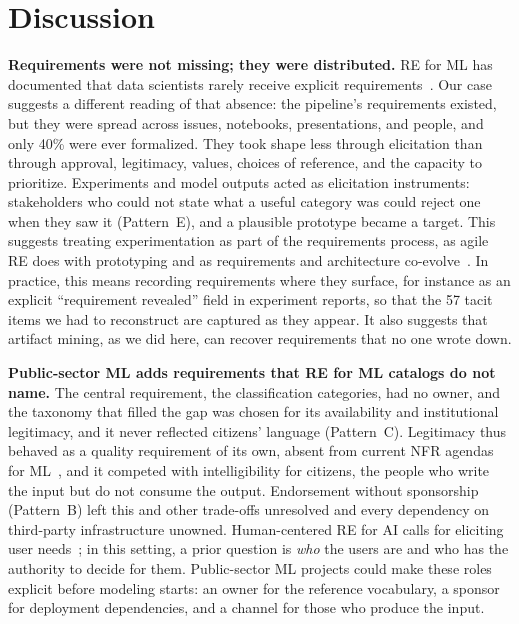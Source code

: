 \documentclass[sigconf,nonacm]{acmart}
\begin{document}
\section{Discussion}
\label{sec:discussion}

\textbf{Requirements were not missing; they were distributed.} RE for ML has documented that data scientists rarely receive explicit requirements~\cite{vogelsang2019}. Our case suggests a different reading of that absence: the pipeline's requirements existed, but they were spread across issues, notebooks, presentations, and people, and only 40\% were ever formalized. They took shape less through elicitation than through approval, legitimacy, values, choices of reference, and the capacity to prioritize. Experiments and model outputs acted as elicitation instruments: stakeholders who could not state what a useful category was could reject one when they saw it (Pattern~E), and a plausible prototype became a target. This suggests treating experimentation as part of the requirements process, as agile RE does with prototyping and as requirements and architecture co-evolve~\cite{cao2008,nuseibeh2001}. In practice, this means recording requirements where they surface, for instance as an explicit ``requirement revealed'' field in experiment reports, so that the 57 tacit items we had to reconstruct are captured as they appear. It also suggests that artifact mining, as we did here, can recover requirements that no one wrote down.

\textbf{Public-sector ML adds requirements that RE for ML catalogs do not name.} The central requirement, the classification categories, had no owner, and the taxonomy that filled the gap was chosen for its availability and institutional legitimacy, and it never reflected citizens' language (Pattern~C). Legitimacy thus behaved as a quality requirement of its own, absent from current NFR agendas for ML~\cite{horkoff2019}, and it competed with intelligibility for citizens, the people who write the input but do not consume the output. Endorsement without sponsorship (Pattern~B) left this and other trade-offs unresolved and every dependency on third-party infrastructure unowned. Human-centered RE for AI calls for eliciting user needs~\cite{ahmad2023}; in this setting, a prior question is \emph{who} the users are and who has the authority to decide for them. Public-sector ML projects could make these roles explicit before modeling starts: an owner for the reference vocabulary, a sponsor for deployment dependencies, and a channel for those who produce the input.
\end{document}
